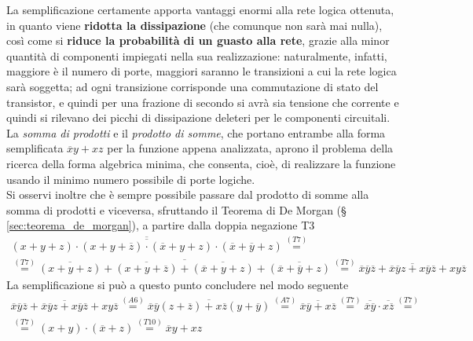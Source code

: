 \documentclass[a4paper]{extarticle}
\begin{document}
\noindent
La semplificazione certamente apporta vantaggi enormi alla rete logica ottenuta, in quanto viene \textbf{ridotta la dissipazione} (che comunque non sarà mai nulla), così come si \textbf{riduce la probabilità di un guasto alla rete}, grazie alla minor quantità di componenti impiegati nella sua realizzazione: naturalmente, infatti, maggiore è il numero di porte, maggiori saranno le transizioni a cui la rete logica sarà soggetta; ad ogni transizione corrisponde una commutazione di stato del transistor, e quindi per una frazione di secondo si avrà sia tensione che corrente e quindi si rilevano dei picchi di dissipazione deleteri per le componenti circuitali.\\
La \emph{somma di prodotti} e il \emph{prodotto di somme}, che portano entrambe alla forma semplificata \(\overline{x}y + xz\) per la funzione appena analizzata, aprono il problema della ricerca della forma algebrica minima, che consenta, cioè, di realizzare la funzione usando il minimo numero possibile di porte logiche.\\
Si osservi inoltre che è sempre possibile passare dal prodotto di somme alla somma di prodotti e viceversa, sfruttando il Teorema di De Morgan (§ \ref{sec:teorema_de_morgan}), a partire dalla doppia negazione T3
\begin{align*}
  \overline{\overline{(x + y + z) \cdot (x + y + \overline{z}) \cdot (\overline{x} + y + z) \cdot (\overline{x} + \overline{y} + z)}} \overset{(T7)}{=}\\
  \overset{(T7)}{=} \overline{\overline{(x + y + z)} + \overline{(x + y + \overline{z})} + \overline{(\overline{x} + y + z)} + \overline{(\overline{x} + \overline{y} + z)}} \overset{(T7)}{=} \overline{\overline{x} \overline{y} \overline{z} + \overline{x} \overline{y} z + x \overline{y} \overline{z} + x y \overline{z}}
\end{align*}
La semplificazione si può a questo punto concludere nel modo seguente
\begin{align*}
  \overline{\overline{x} \overline{y} \overline{z} + \overline{x} \overline{y} z + x \overline{y} \overline{z} + x y \overline{z}} \overset{(A6)}{=} \overline{\overline{x} \overline{y}(z + \overline{z}) + x \overline{z}(y + \overline{y})} \overset{(A7)}{=} \overline{\overline{x} \overline{y} + x \overline{z}} \overset{(T7)}{=} \overline{\overline{x} \overline{y}} \cdot \overline{x \overline{z}} \overset{(T7)}{=}\\
  \overset{(T7)}{=} (x + y) \cdot (\overline{x} + z) \overset{(T10)}{=} \overline{x}y + xz
\end{align*}
\end{document}
